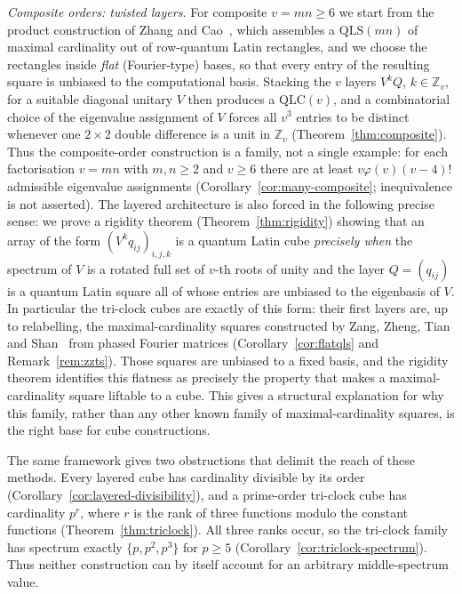 \documentclass[11pt]{amsart}
\theoremstyle{definition}
\newcommand{\Z}{\mathbb{Z}}
\newcommand{\QLS}{\mathrm{QLS}}
\newcommand{\QLC}{\mathrm{QLC}}
\begin{document}
\emph{Composite orders: twisted layers.}  For composite $v=mn\ge6$ we start
from the product construction of Zhang and Cao~\cite{ZhangCao2026,ZZLC2026},
which assembles a $\QLS(mn)$ of maximal cardinality out of row-quantum Latin
rectangles, and we choose the rectangles inside \emph{flat} (Fourier-type)
bases, so that every entry of the resulting square is unbiased to the
computational basis.  Stacking the $v$ layers $V^kQ$, $k\in\Z_v$, for a
suitable diagonal unitary $V$ then produces a $\QLC(v)$, and a combinatorial
choice of the eigenvalue assignment of $V$ forces all $v^3$ entries to be
distinct whenever one $2\times2$ double difference is a unit in $\Z_v$
(Theorem~\ref{thm:composite}).  Thus the composite-order construction is a
family, not a single example: for each factorisation $v=mn$ with $m,n\ge2$
and $v\ge6$ there are at least $v\varphi(v)(v-4)!$ admissible eigenvalue
assignments (Corollary~\ref{cor:many-composite}; inequivalence is not
asserted).  The layered architecture is also forced in the following
precise sense: we prove a rigidity theorem
(Theorem~\ref{thm:rigidity}) showing that an array of the form
$(V^kq_{ij})_{i,j,k}$ is a quantum Latin cube \emph{precisely when} the
spectrum of $V$ is a rotated full set of $v$-th roots of unity and the layer
$Q=(q_{ij})$ is a quantum Latin square all of whose entries are unbiased to
the eigenbasis of $V$.  In particular the tri-clock cubes are exactly of
this form: their first layers are, up to relabelling, the
maximal-cardinality squares constructed by Zang, Zheng, Tian and
Shan~\cite[Thm.~3.1]{ZZTS2025} from phased Fourier matrices
(Corollary~\ref{cor:flatqls} and Remark~\ref{rem:zzts}).  Those squares are
unbiased to a fixed basis, and the rigidity theorem identifies this
flatness as precisely the property that makes a maximal-cardinality square
liftable to a cube.  This gives a structural explanation for why this
family, rather than any other known family of maximal-cardinality squares,
is the right base for cube constructions.

The same framework gives two obstructions that delimit the reach of these
methods.  Every layered cube has cardinality divisible by its order
(Corollary~\ref{cor:layered-divisibility}), and a prime-order tri-clock cube
has cardinality $p^r$, where $r$ is the rank of three functions modulo the
constant functions (Theorem~\ref{thm:triclock}).  All three ranks occur, so
the tri-clock family has spectrum exactly $\{p,p^2,p^3\}$ for $p\ge5$
(Corollary~\ref{cor:triclock-spectrum}).  Thus neither construction can by
itself account for an arbitrary middle-spectrum value.
\end{document}
